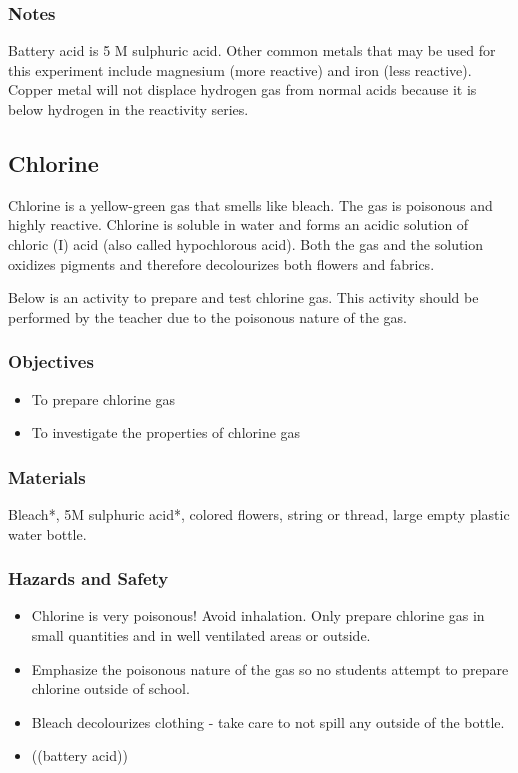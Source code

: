 \subsubsection*{Notes}
Battery acid is 5 M sulphuric acid. Other common metals that may be used for this experiment include magnesium (more reactive) and iron (less reactive). Copper metal will not displace hydrogen gas from normal acids because it is below hydrogen in the reactivity series.

\subsection{Chlorine}

Chlorine is a yellow-green gas that smells like bleach. The gas is poisonous and highly reactive. Chlorine is soluble in water and forms an acidic solution of chloric (I) acid (also called hypochlorous acid). Both the gas and the solution oxidizes pigments and therefore decolourizes both flowers and fabrics.

Below is an activity to prepare and test chlorine gas. This activity should be performed by the teacher due to the poisonous nature of the gas.

\subsubsection*{Objectives}
\begin{itemize}
\item{To prepare chlorine gas}
\item{To investigate the properties of chlorine gas}
\end{itemize}

\subsubsection*{Materials}
Bleach*, 5M sulphuric acid*, colored flowers, string or thread, large empty plastic water bottle.

\subsubsection*{Hazards and Safety}
\begin{itemize}
\item{Chlorine is very poisonous! Avoid inhalation. Only prepare chlorine gas in small quantities and in well ventilated areas or outside.}
\item{Emphasize the poisonous nature of the gas so no students attempt to prepare chlorine outside of school.}
\item{Bleach decolourizes clothing - take care to not spill any outside of the bottle.}
\item{((battery acid))}
\end{itemize}

